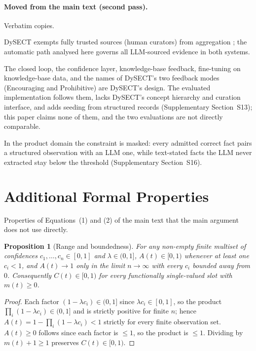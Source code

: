 \documentclass[11pt]{article}
\newtheorem{proposition}{Proposition}[section]
\begin{document}
\paragraph{Moved from the main text (second pass).} Verbatim copies.

DySECT exempts fully trusted sources (human curators) from aggregation
\citep[Sect.~2.2, footnote~3]{aminnaseri2026dysect}; the automatic path
analysed here governs all LLM-sourced evidence in both systems.

The closed loop, the confidence layer, knowledge-base feedback,
fine-tuning on knowledge-base data, and the names of DySECT's two
feedback modes (Encouraging and Prohibitive) are DySECT's design. The
evaluated implementation follows them, lacks DySECT's concept hierarchy
and curation interface, and adds seeding from structured records
(Supplementary Section~S13); this paper claims none of them, and the two
evaluations are not directly comparable.

In the product domain the constraint is masked: every admitted
correct fact pairs a structured observation with an LLM one, while
text-stated facts the LLM never extracted stay below the threshold
(Supplementary Section~S16).

\section{Additional Formal Properties}
\label{sec:s14}

Properties of Equations~(1) and (2) of the main text that the main
argument does not use directly.

\begin{proposition}[Range and boundedness]
For any non-empty finite multiset of confidences $c_1,\dots,c_n \in [0,1]$
and $\lambda \in (0,1]$, $A(t) \in [0,1)$ whenever at least one $c_i < 1$,
and $A(t) \to 1$ only in the limit $n\to\infty$ with every $c_i$ bounded
away from $0$. Consequently $C(t) \in [0,1)$ for every functionally
single-valued slot with $m(t) \ge 0$.
\end{proposition}
\begin{proof}
Each factor $(1-\lambda c_i) \in (0,1]$ since $\lambda c_i \in [0,1]$, so
the product $\prod_i(1-\lambda c_i) \in (0,1]$ and is strictly positive
for finite $n$; hence $A(t) = 1 - \prod_i(1-\lambda c_i) < 1$ strictly for
every finite observation set. $A(t) \ge 0$ follows since each factor is
$\le 1$, so the product is $\le 1$. Dividing by $m(t)+1 \ge 1$ preserves
$C(t) \in [0,1)$.
\end{proof}
\end{document}
